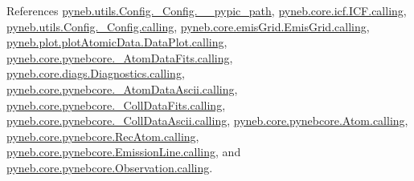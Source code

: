 References \hyperlink{_config_8py_source_l00078}{pyneb.\+utils.\+Config.\+\_\+\+Config.\+\_\+\+\_\+pypic\+\_\+path}, \hyperlink{icf_8py_source_l00016}{pyneb.\+core.\+icf.\+I\+C\+F.\+calling}, \hyperlink{_config_8py_source_l00032}{pyneb.\+utils.\+Config.\+\_\+\+Config.\+calling}, \hyperlink{emis_grid_8py_source_l00041}{pyneb.\+core.\+emis\+Grid.\+Emis\+Grid.\+calling}, \hyperlink{plot_atomic_data_8py_source_l00042}{pyneb.\+plot.\+plot\+Atomic\+Data.\+Data\+Plot.\+calling}, \hyperlink{pynebcore_8py_source_l00090}{pyneb.\+core.\+pynebcore.\+\_\+\+Atom\+Data\+Fits.\+calling}, \hyperlink{diags_8py_source_l00169}{pyneb.\+core.\+diags.\+Diagnostics.\+calling}, \hyperlink{pynebcore_8py_source_l00311}{pyneb.\+core.\+pynebcore.\+\_\+\+Atom\+Data\+Ascii.\+calling}, \hyperlink{pynebcore_8py_source_l00568}{pyneb.\+core.\+pynebcore.\+\_\+\+Coll\+Data\+Fits.\+calling}, \hyperlink{pynebcore_8py_source_l00918}{pyneb.\+core.\+pynebcore.\+\_\+\+Coll\+Data\+Ascii.\+calling}, \hyperlink{pynebcore_8py_source_l01175}{pyneb.\+core.\+pynebcore.\+Atom.\+calling}, \hyperlink{pynebcore_8py_source_l02572}{pyneb.\+core.\+pynebcore.\+Rec\+Atom.\+calling}, \hyperlink{pynebcore_8py_source_l03263}{pyneb.\+core.\+pynebcore.\+Emission\+Line.\+calling}, and \hyperlink{pynebcore_8py_source_l03419}{pyneb.\+core.\+pynebcore.\+Observation.\+calling}.



